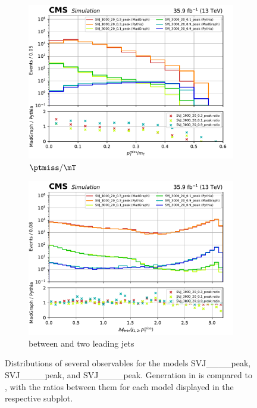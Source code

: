 \begin{figure}[htbp]
    \begin{subfigure}[b]{0.48\textwidth}
        \includegraphics[width=\textwidth]{figures/madgraph_pythia_comparisons/with_ratios/part1/met_over_mt.pdf}
        \caption{$\ptmiss/\mT$}
    \end{subfigure}
    \hfill
    \begin{subfigure}[b]{0.48\textwidth}
        \includegraphics[width=\textwidth]{figures/madgraph_pythia_comparisons/with_ratios/part1/min_dphi.pdf}
        \caption{\mindphi between \ptmiss and two leading \glspl{jet}}
    \end{subfigure}
    \caption[Distributions of several observables for the models SVJ\_\_\_\_\-peak, SVJ\_\_\_\_\-peak, and SVJ\_\_\_\_\-peak]{Distributions of several observables for the models SVJ\_\_\_\_\-peak, SVJ\_\_\_\_\-peak, and SVJ\_\_\_\_\-peak. Generation in \MGvATNLO is compared to \PYTHIAEIGHT, with the ratios between them for each model displayed in the respective subplot.}
    \label{fig:svj_mg_pythia_comparison_set1}
\end{figure}

